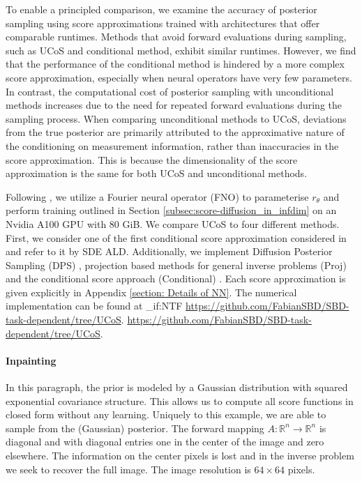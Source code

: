 \documentclass[10pt]{article} %
\newcommand{\R}{\mathbb{R}}
\theoremstyle{plain}
\theoremstyle{definition}
\theoremstyle{remark}
\newcommand{\fabian}[1]{{#1}}%
\begin{document}
\fabian{To enable a principled comparison, we examine the accuracy of posterior sampling using score approximations trained with architectures that offer comparable runtimes. 
Methods that avoid forward evaluations during sampling, such as UCoS and conditional method, exhibit similar runtimes. However, we find that the performance of the conditional method is hindered by a more complex score approximation, especially when neural operators have very few parameters.
In contrast, the computational cost of posterior sampling with unconditional methods increases due to the need for repeated forward evaluations during the sampling process. When comparing unconditional methods to UCoS, deviations from the true posterior are primarily attributed to the approximative nature of the conditioning on measurement information, rather than inaccuracies in the score approximation. This is because the dimensionality of the score approximation is the same for both UCoS and unconditional methods.}

Following \cite{baldassari2024conditional}, we utilize a Fourier neural operator (FNO) \cite{li2021fourier} to parameterise $r_\theta$ and perform training outlined in Section \ref{subsec:score-diffusion_in_infdim} on an Nvidia A100 GPU with 80 GiB. We compare UCoS to four different methods. First, we consider one of the first conditional score approximation considered in \cite{jalal2021robustannealedlangevian, feng2023scorebased} and refer to it by SDE ALD.
Additionally, we implement Diffusion Posterior Sampling (DPS) \cite{chung2023diffusion}, projection based methods for general inverse problems (Proj) \cite{Dey_2024} and the conditional score approach (Conditional) \cite{baldassari2024conditional}. 
Each score approximation is given explicitly in Appendix \ref{section: Details of NN}. 
The numerical implementation can be found at 
\ExplSyntaxOn
\bool_if:NTF \accepted
    {\url{https://github.com/FabianSBD/SBD-task-dependent/tree/UCoS}.}
    {\url{https://github.com/FabianSBD/SBD-task-dependent/tree/UCoS}.}
\ExplSyntaxOff
\paragraph{Inpainting} In this paragraph, the prior is modeled by a Gaussian distribution with squared exponential covariance structure. This allows us to compute all score functions in closed form without any learning. Uniquely to this example, we are able to sample from the (Gaussian) posterior. 
The forward mapping $A: \R^n \rightarrow \R^n$ is diagonal and with diagonal entries one in the center of the image and zero elsewhere. The information on the center pixels is lost and in the inverse problem we seek to recover the full image. The image resolution is $64 \times 64$ pixels.
\end{document}
